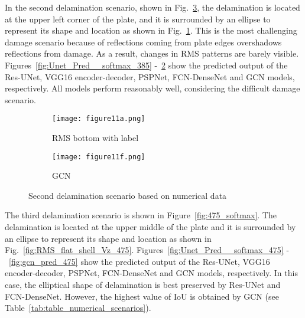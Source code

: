 \documentclass[runningheads]{llncs}
\begin{document}
In the second delamination scenario, shown in Fig.~\ref{fig:385_softmax}, the delamination is located at the upper left corner of the plate, and it is surrounded by an ellipse to represent its shape and location as shown in Fig.~\ref{fig:RMS_flat_shell_Vz_385}.
This is the most challenging damage scenario because of reflections coming from plate edges overshadows reflections from damage.
As a result, changes in RMS patterns are barely visible.
Figures~\ref{fig:Unet_Pred__softmax_385} -~\ref{fig:gcn_pred_385} show the predicted output of the Res-UNet, VGG16 encoder-decoder, PSPNet, FCN-DenseNet and GCN models, respectively. 
All models perform reasonably well, considering the difficult damage scenario.
\begin{figure}[!ht]
	\centering
	\begin{subfigure}[b]{0.47\textwidth}
		\centering
		\texttt{[image: figure11a.png]}
		\caption{RMS bottom with label}
		\label{fig:RMS_flat_shell_Vz_385}
	\end{subfigure}

	\begin{subfigure}[b]{0.47\textwidth}
		\centering
		\texttt{[image: figure11f.png]}
		\caption{GCN}
		\label{fig:gcn_pred_385}
	\end{subfigure}
	\caption{Second delamination scenario based on numerical data}
	\label{fig:385_softmax}
\end{figure}
The third delamination scenario is shown in Figure~\ref{fig:475_softmax}. 
The delamination is located at the upper middle of the plate and it is surrounded by an ellipse to represent its shape and location as shown in Fig.~\ref{fig:RMS_flat_shell_Vz_475}.
Figures~\ref{fig:Unet_Pred__softmax_475} -~\ref{fig:gcn_pred_475} show the predicted output of the Res-UNet, VGG16 encoder-decoder, PSPNet, FCN-DenseNet and GCN models, respectively. 
In this case, the elliptical shape of delamination is best preserved by Res-UNet and FCN-DenseNet. 
However, the highest value of IoU is obtained by GCN (see Table~\ref{tab:table_numerical_scenarios}).
\end{document}
